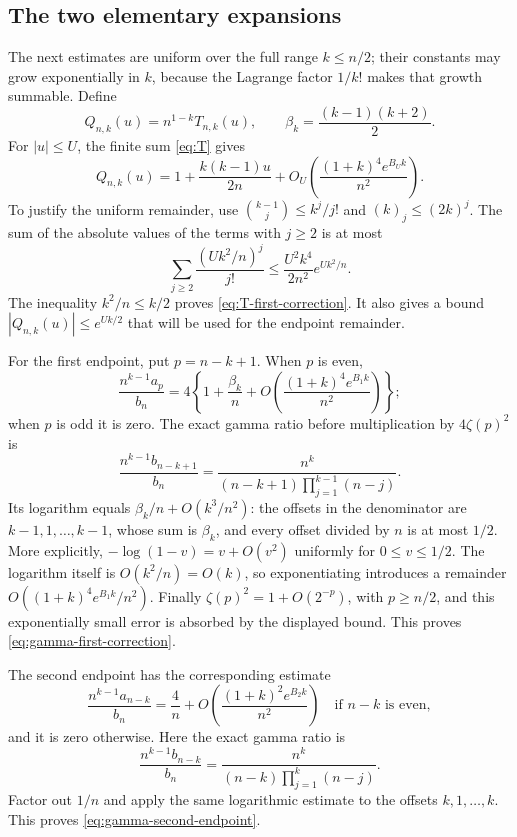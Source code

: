 \subsection{The two elementary expansions}

The next estimates are uniform over the full range $k\le n/2$; their
constants may grow exponentially in $k$, because the Lagrange factor
$1/k!$ makes that growth summable. Define
\[
 Q_{n,k}(u)=n^{1-k}T_{n,k}(u),\qquad
 \beta_k=\frac{(k-1)(k+2)}2.
\]
For $|u|\le U$, the finite sum \eqref{eq:T} gives
\begin{equation}\label{eq:T-first-correction}
 Q_{n,k}(u)=1+\frac{k(k-1)u}{2n}
       +O_U\left(\frac{(1+k)^4e^{B_Uk}}{n^2}\right).
\end{equation}
To justify the uniform remainder, use
$\binom{k-1}{j}\le k^j/j!$ and $(k)_j\le(2k)^j$. The sum of the absolute
values of the terms with $j\ge2$ is at most
\[
 \sum_{j\ge2}\frac{(Uk^2/n)^j}{j!}
 \le\frac{U^2k^4}{2n^2}e^{Uk^2/n}.
\]
The inequality $k^2/n\le k/2$ proves
\eqref{eq:T-first-correction}. It also gives a bound
$|Q_{n,k}(u)|\le e^{Uk/2}$ that will be used for the endpoint remainder.

For the first endpoint, put $p=n-k+1$. When $p$ is even,
\begin{equation}\label{eq:gamma-first-correction}
 \frac{n^{k-1}a_p}{b_n}
 =4\left\{1+\frac{\beta_k}{n}
       +O\left(\frac{(1+k)^4e^{B_1k}}{n^2}\right)\right\};
\end{equation}
when $p$ is odd it is zero. The exact gamma ratio before multiplication
by $4\zeta(p)^2$ is
\begin{equation}\label{eq:gamma-ratio-exact}
 \frac{n^{k-1}b_{n-k+1}}{b_n}
 =\frac{n^k}{(n-k+1)\prod_{j=1}^{k-1}(n-j)}.
\end{equation}
Its logarithm equals $\beta_k/n+O(k^3/n^2)$: the offsets in the
denominator are $k-1,1,\ldots,k-1$, whose sum is $\beta_k$, and every
offset divided by $n$ is at most $1/2$. More explicitly,
$-\log(1-v)=v+O(v^2)$ uniformly for $0\le v\le1/2$. The logarithm
itself is $O(k^2/n)=O(k)$, so exponentiating introduces a remainder
$O((1+k)^4e^{B_1k}/n^2)$. Finally
$\zeta(p)^2=1+O(2^{-p})$, with $p\ge n/2$, and this exponentially small
error is absorbed by the displayed bound. This proves
\eqref{eq:gamma-first-correction}.

The second endpoint has the corresponding estimate
\begin{equation}\label{eq:gamma-second-endpoint}
 \frac{n^{k-1}a_{n-k}}{b_n}
 =\frac4n+O\left(\frac{(1+k)^2e^{B_2k}}{n^2}\right)
       \quad\text{if }n-k\text{ is even},
\end{equation}
and it is zero otherwise. Here the exact gamma ratio is
\[
 \frac{n^{k-1}b_{n-k}}{b_n}
 =\frac{n^k}{(n-k)\prod_{j=1}^{k}(n-j)}.
\]
Factor out $1/n$ and apply the same logarithmic estimate to the offsets
$k,1,\ldots,k$. This proves \eqref{eq:gamma-second-endpoint}.


